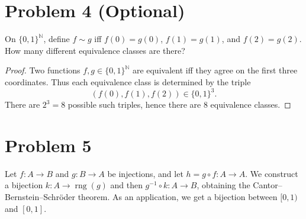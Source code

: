 \documentclass[answers,12pt,addpoints]{exam}
\begin{document}
\section*{Problem 4 (Optional)}
On $\{0,1\}^{\mathbb{N}}$, define $f \sim g$ iff $f(0) = g(0)$, $f(1) = g(1)$, and $f(2) = g(2)$.
How many different equivalence classes are there?

\begin{proof}
Two functions $f,g \in \{0,1\}^{\mathbb{N}}$ are equivalent iff they agree on the first
three coordinates. Thus each equivalence class is determined by the triple
\[
(f(0), f(1), f(2)) \in \{0,1\}^3.
\]
There are $2^3 = 8$ possible such triples, hence there are $8$ equivalence classes.
\end{proof}

\section*{Problem 5}
Let $f : A \to B$ and $g : B \to A$ be injections, and let $h = g \circ f : A \to A$.
We construct a bijection $k : A \to \operatorname{rng}(g)$ and then $g^{-1} \circ k : A \to B$,
obtaining the Cantor--Bernstein--Schröder theorem. As an application, we get a bijection
between $[0,1)$ and $[0,1]$.
\end{document}
